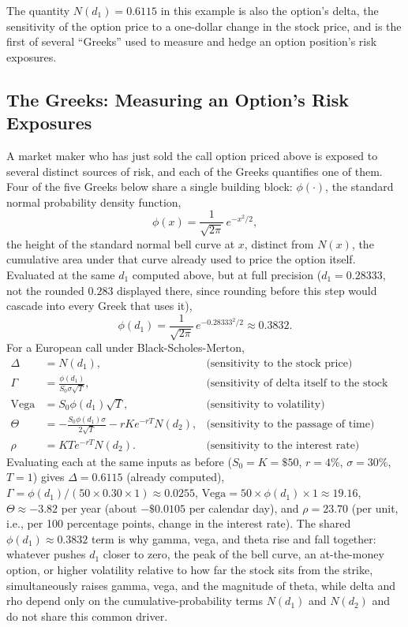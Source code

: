 \documentclass[../ai_in_finance]{subfiles}
\begin{document}
The quantity $N(d_1) = 0.6115$ in this example is also the option's delta, the sensitivity of the option price to a one-dollar change in the stock price, and is the first of several ``Greeks'' used to
measure and hedge an option position's risk exposures.

\subsection{The Greeks: Measuring an Option's Risk Exposures}

A market maker who has just sold the call option priced above is exposed to several distinct sources of risk, and each of the Greeks quantifies one of them. Four of the five Greeks below share a single building block: $\phi(\cdot)$, the standard normal probability density function,
\begin{equation*}
\phi(x) = \frac{1}{\sqrt{2\pi}}\,e^{-x^2/2},
\end{equation*}
the height of the standard normal bell curve at $x$, distinct from $N(x)$, the cumulative area under that curve already used to price the option itself. Evaluated at the same $d_1$ computed above, but at full precision ($d_1 = 0.28333$, not the rounded $0.283$ displayed there, since rounding before this step would cascade into every Greek that uses it),
\begin{equation*}
\phi(d_1) = \frac{1}{\sqrt{2\pi}}\,e^{-0.28333^2/2} \approx 0.3832.
\end{equation*}
For a European call under Black-Scholes-Merton,
\begin{align*}
\Delta &= N(d_1), &\text{(sensitivity to the stock price)} \\
\Gamma &= \frac{\phi(d_1)}{S_0 \sigma \sqrt{T}}, &\text{(sensitivity of delta itself to the stock price)} \\
\text{Vega} &= S_0 \phi(d_1) \sqrt{T}, &\text{(sensitivity to volatility)} \\
\Theta &= -\frac{S_0 \phi(d_1) \sigma}{2\sqrt{T}} - r K e^{-rT} N(d_2), &\text{(sensitivity to the passage of time)} \\
\rho &= K T e^{-rT} N(d_2). &\text{(sensitivity to the interest rate)}
\end{align*}
Evaluating each at the same inputs as before ($S_0=K=\$50$, $r=4\%$, $\sigma=30\%$, $T=1$) gives $\Delta = 0.6115$ (already computed), $\Gamma = \phi(d_1)/(50 \times 0.30 \times 1) \approx 0.0255$, $\text{Vega} = 50 \times \phi(d_1) \times 1 \approx 19.16$, $\Theta \approx -3.82$ per year (about $-\$0.0105$ per calendar day), and $\rho = 23.70$ (per unit, i.e., per 100 percentage points, change in the interest rate). The shared $\phi(d_1) \approx 0.3832$ term is why gamma, vega, and theta rise and fall together: whatever pushes $d_1$ closer to zero, the peak of the bell curve, an at-the-money option, or higher volatility relative to how far the stock sits from the strike, simultaneously raises gamma, vega, and the magnitude of theta, while delta and rho depend only on the cumulative-probability terms $N(d_1)$ and $N(d_2)$ and do not share this common driver.
\end{document}
